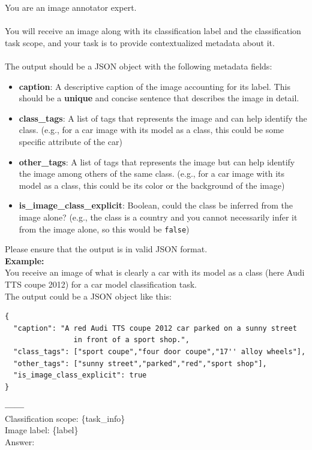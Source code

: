 \begin{tcolorbox}[colback=gray!5,colframe=black,title=\natcap{} Annotation Prompt,fonttitle=\bfseries]
You are an image annotator expert.\\\\
You will receive an image along with its classification label and the classification task scope, and your task is to provide contextualized metadata about it.\\\\
The output should be a JSON object with the following metadata fields:
\begin{itemize}
  \item \textbf{caption}: A descriptive caption of the image accounting for its label. This should be a \textbf{unique} and concise sentence that describes the image in detail.
  \item \textbf{class\_tags}: A list of tags that represents the image and can help identify the class. (e.g., for a car image with its model as a class, this could be some specific attribute of the car)
  \item \textbf{other\_tags}: A list of tags that represents the image but can help identify the image among others of the same class. (e.g., for a car image with its model as a class, this could be its color or the background of the image)
  \item \textbf{is\_image\_class\_explicit}: Boolean, could the class be inferred from the image alone? (e.g., the class is a country and you cannot necessarily infer it from the image alone, so this would be \texttt{false})
\end{itemize}

Please ensure that the output is in valid JSON format.\\

\textbf{Example:}\\
You receive an image of what is clearly a car with its model as a class (here Audi TTS coupe 2012) for a car model classification task.\\
The output could be a JSON object like this:

\begin{lstlisting}[basicstyle=\ttfamily\small]
{
  "caption": "A red Audi TTS coupe 2012 car parked on a sunny street 
                in front of a sport shop.",
  "class_tags": ["sport coupe","four door coupe","17'' alloy wheels"],
  "other_tags": ["sunny street","parked","red","sport shop"],
  "is_image_class_explicit": true
}
\end{lstlisting}

\textbf{------}\\
Classification scope: \{task\_info\}\\
Image label: \{label\}\\
Answer:
\label{box:natcap_prompt}
\end{tcolorbox}